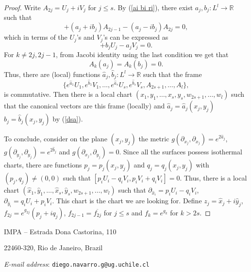 \documentclass{article}
\theoremstyle{remark}
\begin{document}
\begin{proof}
    Write $A_{2j}=U_j+iV_j$ for $j\leq s$. By (\ref{ai bi ri}), there exist $a_j,b_j:L^l\rightarrow\mathbb{R}$ such that
    \begin{equation*}
        [A_{2j-1},A_{2j}]+(a_j+ib_j)A_{2j-1}-(a_j-ib_j)A_{2j}=0,
    \end{equation*}
    which in terms of the $U_j$'s and $V_j$'s can be expressed as
    \begin{equation*}
        [U_j,V_j]+b_jU_j-a_jV_j=0.
    \end{equation*}
    For $k\neq 2j,2j-1$, from Jacobi identity using the last condition we get that
    \begin{equation}\label{dsa}
        A_k(a_j)=A_k(b_j)=0.
    \end{equation}
    Thus, there are (local) functions $\hat{a}_j,\hat{b}_j:L^l\rightarrow \mathbb{R}$ such that the frame 
    $$\{e^{\hat{a}_1}U_1,e^{\hat{b}_1}V_1,\ldots,e^{\hat{a}_s}U_s,e^{\hat{b}_s}V_s, A_{2s+1},\ldots,A_l\},$$ 
    is commutative. Then there is a local chart $(x_1,y_1,\ldots,x_s,y_s,w_{2s+1},\ldots,w_l)$ such that the canonical vectors are this frame (locally) and $\hat{a}_j=\hat{a}_j(x_j,y_j)$ $\hat{b}_j=\hat{b}_j(x_j,y_j)$  by (\ref{dsa}). 
    
    To conclude, consider on the plane $(x_j,y_j)$ the metric $g(\partial_{x_j},\partial_{x_j})=e^{2\hat{a}_j}$, $g(\partial_{y_j},\partial_{y_j})=e^{2\hat{b}_j}$ and $g(\partial_{x_j},\partial_{y_j})=0$. 
    Since all the surfaces possess isothermal charts, there are functions $p_j=p_j(x_j,y_j)$ and $q_j=q_j(x_j,y_j)$ with $(p_j,q_j)\neq (0,0)$ such that $[p_iU_i-q_iV_i,p_iV_i+q_iV_i]=0$. 
    Thus, there is a local chart $(\hat{x}_1,\hat{y}_1,\ldots,\hat{x}_s,\hat{y}_s,w_{2s+1},\ldots,w_l)$ such that $\partial_{\hat{x}_i}=p_iU_i-q_iV_i$, $\partial_{\hat{y}_i}=q_iU_i+p_iV_i$. This chart is the chart we are looking for. Define $z_j=\hat{x}_j+i\hat{y}_j$, $f_{2j}=e^{g_{2j}}(p_j+iq_j)$, $f_{2j-1}=\overline{f_{2j}}$ for $j\leq s$ and $f_k=e^{g_k}$ for $k> 2s$. 
\end{proof}

\printbibliography

IMPA – Estrada Dona Castorina, 110

22460-320, Rio de Janeiro, Brazil

{\it E-mail address}: {\tt diego.navarro.g@ug.uchile.cl}
\end{document}
